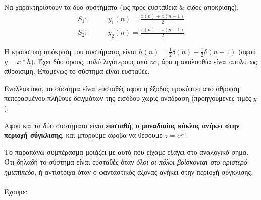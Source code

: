 \documentclass[11pt,a4paper,notitlepage,fleqn,draft]{article}
\begin{document}
\begin{exercise}
\end{exercise}

\begin{exercise}
	Να χαρακτηριστούν τα δύο συστήματα (ως προς ευστάθεια \& είδος απόκρισης):
	\begin{align*}
		S_1: \qquad & y_1(n) = \frac{x(n) + x(n-1)}{2}\\
		S_2: \qquad & y_2(n) = \frac{x(n) - x(n-1)}{2}
	\end{align*}
	
	\tcblower
	
	Η κρουστική απόκριση
	του συστήματος είναι \( h(n) = \frac{1}{2}δ(n) + \frac{1}{2}δ(n-1) \) (αφού \( y=x*h \)). Έχει δύο
	όρους, πολύ λιγότερους από \( \infty \), άρα η ακολουθία είναι απολύτως αθροίσιμη. Επομένως το σύστημα είναι ευσταθές.
	
	Εναλλακτικά, το σύστημα είναι ευσταθές αφού η έξοδος προκύπτει από άθροιση πεπερασμένου πλήθους δειγμάτων της εισόδου χωρίς ανάδραση (προηγούμενες τιμές \( y \)).
	
	Αφού και τα δύο συστήματα είναι \textbf{ευσταθή}, \textbf{ο μοναδιαίος κύκλος ανήκει στην περιοχή σύγκλισης}, και
	μπορούμε άφοβα να θέσουμε \( z=e^{j\omega } \).
	
	Το παραπάνω συμπέρασμα μοιάζει με αυτό που είχαμε εξάγει στο αναλογικό σήμα. Ότι δηλαδή το σύστημα
	είναι ευσταθές όταν \emph{όλοι οι πόλοι βρίσκονται στο αριστερό ημιεπίπεδο}, ή αντίστοιχα όταν ο
	φανταστικός άξονας ανήκει στην περιοχή σύγκλισης.
	
	\paragraph{}
	
	Έχουμε:
	

\end{exercise}
\end{document}
